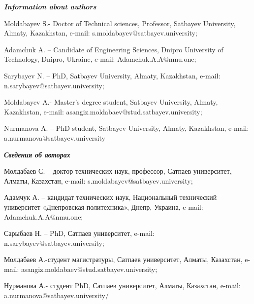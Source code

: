 \emph{{\bfseries Information about authors}}

Moldabayev S.- Doctor of Technical sciences, Professor, Satbayev
University, Almaty, Kazakhstan, e-mail:
s.moldabayev@satbayev.university;

Adamchuk A. -- Candidate of Engineering Sciences, Dnipro University of
Technology, Dnipro, Ukraine, e-mail: Adamchuk.A.A@nmu.one;

Sarybayev N. -- PhD, Satbayev University, Almaty, Kazakhstan, e-mail:
n.sarybayev@satbayev.university;

Moldabayev A.- Master's degree student, Satbayev University, Almaty,
Kazakhstan, e-mail: asangiz.moldabaev@stud.satbayev.university;

Nurmanova A. -- PhD student, Satbayev University, Almaty, Kazakhstan,
e-mail: a.nurmanova@satbayev.university

\emph{{\bfseries Сведения об авторах}}

Молдабаев С. -- доктор технических наук, профессор, Сатпаев университет,
Алматы, Казахстан, e-mail: s.moldabayev@satbayev.university;

Адамчук А. -- кандидат технических наук, Национальный технический
университет «Днепровская политехника», Днепр, Украина, e-mail:
Adamchuk.A.A@nmu.one;

Сарыбаев Н. -- PhD, Сатпаев университет, e-mail:
n.sarybayev@satbayev.university;

Молдабаев А.-студент магистратуры, Сатпаев университет, Алматы,
Казахстан, e-mail: asangiz.moldabaev@stud.satbayev.university;

Нурманова А.- студент PhD, Сатпаев университет, Алматы, Казахстан,
e-mail: a.nurmanova@satbayev.university/
